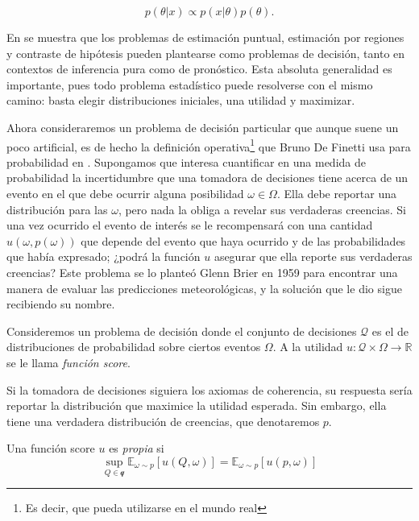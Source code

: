 \documentclass[main.tex]{subfiles}
\begin{document}
\begin{equation*}
	p(\theta | x ) 	\propto p(x|\theta)p(\theta).
\end{equation*}

En \cite{bernardo} se muestra que los problemas de estimación puntual, estimación por regiones y contraste de hipótesis pueden plantearse como problemas de decisión, tanto en contextos de inferencia pura como de pronóstico. Esta absoluta generalidad es importante, pues todo problema estadístico puede resolverse con el mismo camino: basta elegir distribuciones iniciales, una utilidad y maximizar.

Ahora consideraremos un problema de decisión particular que aunque suene un poco artificial, es de hecho la definición operativa\footnote{Es decir, que pueda utilizarse en el mundo real} que Bruno De Finetti usa para probabilidad en \cite{definetti2008}.  Supongamos que interesa cuantificar en una medida de probabilidad la incertidumbre que una tomadora de decisiones tiene acerca de un evento en el que debe ocurrir alguna posibilidad  $\omega \in \Omega$. Ella debe reportar una distribución para las $\omega$, pero nada la obliga a revelar sus verdaderas creencias. Si una vez ocurrido el evento de interés se le recompensará con una cantidad $u(\omega,p(\omega))$ que depende del evento que haya ocurrido y de las probabilidades que había expresado; ¿podrá la función $u$  asegurar que ella reporte sus verdaderas creencias?  Este problema se lo planteó Glenn Brier en 1959 para encontrar una manera de evaluar las predicciones meteorológicas, y la solución que le dio sigue recibiendo su nombre. 

\begin{definition}
	Consideremos un problema de decisión donde el conjunto de decisiones $\mathcal{Q}$ es el de distribuciones de probabilidad sobre ciertos eventos $\Omega$. A la utilidad $u: \mathcal{Q}\times\Omega \to \mathbb{R}$ se le llama \textit{función score}.
\end{definition}

Si la tomadora de decisiones siguiera los axiomas de coherencia, su respuesta sería reportar la distribución que maximice la utilidad esperada. Sin embargo, ella tiene una verdadera distribución de creencias, que denotaremos $p$. 

\begin{definition}
	Una función score $u$ es \textit{propia} si
	\begin{equation*}
		\sup_{Q \in \mathcal{q}} \mathbb{E}_{\omega\sim p}\left[u(Q,\omega)\right] = \mathbb{E}_{\omega\sim p}\left[u(p,\omega)\right]
	\end{equation*}
\end{definition}
\end{document}
